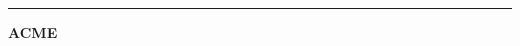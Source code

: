 \documentclass{article}
\begin{document}
\noindent\rule{32mm}{1.4pt}\par\vspace{2mm}\centering\fontsize{22}{22}\selectfont\bfseries ACME
\end{document}
